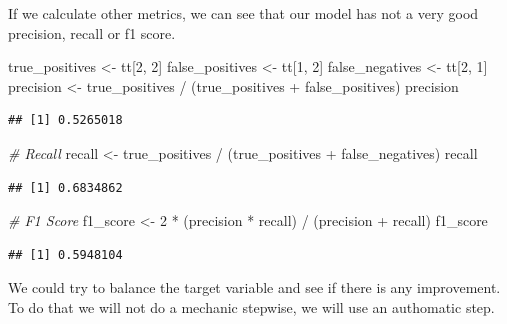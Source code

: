 \documentclass[
  twoside]{article}
\newenvironment{Shaded}{\begin{snugshade}}{\end{snugshade}}
\newcommand{\CommentTok}[1]{\textcolor[rgb]{0.56,0.35,0.01}{\textit{#1}}}
\newcommand{\DecValTok}[1]{\textcolor[rgb]{0.00,0.00,0.81}{#1}}
\newcommand{\NormalTok}[1]{#1}
\newcommand{\OtherTok}[1]{\textcolor[rgb]{0.56,0.35,0.01}{#1}}
\newcommand{\SpecialCharTok}[1]{\textcolor[rgb]{0.00,0.00,0.00}{#1}}
\begin{document}
If we calculate other metrics, we can see that our model has not a very
good precision, recall or f1 score.

\begin{Shaded}
\begin{Highlighting}[]
\NormalTok{true\_positives }\OtherTok{\textless{}{-}}\NormalTok{ tt[}\DecValTok{2}\NormalTok{, }\DecValTok{2}\NormalTok{]}
\NormalTok{false\_positives }\OtherTok{\textless{}{-}}\NormalTok{ tt[}\DecValTok{1}\NormalTok{, }\DecValTok{2}\NormalTok{]}
\NormalTok{false\_negatives }\OtherTok{\textless{}{-}}\NormalTok{ tt[}\DecValTok{2}\NormalTok{, }\DecValTok{1}\NormalTok{]}
\NormalTok{precision }\OtherTok{\textless{}{-}}\NormalTok{ true\_positives }\SpecialCharTok{/}\NormalTok{ (true\_positives }\SpecialCharTok{+}\NormalTok{ false\_positives)}
\NormalTok{precision}
\end{Highlighting}
\end{Shaded}

\begin{verbatim}
## [1] 0.5265018
\end{verbatim}

\begin{Shaded}
\begin{Highlighting}[]
\CommentTok{\# Recall}
\NormalTok{recall }\OtherTok{\textless{}{-}}\NormalTok{ true\_positives }\SpecialCharTok{/}\NormalTok{ (true\_positives }\SpecialCharTok{+}\NormalTok{ false\_negatives)}
\NormalTok{recall}
\end{Highlighting}
\end{Shaded}

\begin{verbatim}
## [1] 0.6834862
\end{verbatim}

\begin{Shaded}
\begin{Highlighting}[]
\CommentTok{\# F1 Score}
\NormalTok{f1\_score }\OtherTok{\textless{}{-}} \DecValTok{2} \SpecialCharTok{*}\NormalTok{ (precision }\SpecialCharTok{*}\NormalTok{ recall) }\SpecialCharTok{/}\NormalTok{ (precision }\SpecialCharTok{+}\NormalTok{ recall)}
\NormalTok{f1\_score}
\end{Highlighting}
\end{Shaded}

\begin{verbatim}
## [1] 0.5948104
\end{verbatim}

We could try to balance the target variable and see if there is any
improvement. To do that we will not do a mechanic stepwise, we will use
an authomatic step.
\end{document}
